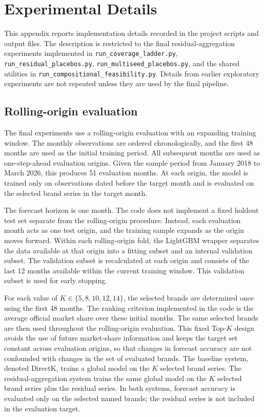 \appendix

\section{Experimental Details}
\label{app:experimental-details}

This appendix reports implementation details recorded in the project scripts and output files. The description is restricted to the final residual-aggregation experiments implemented in \texttt{run\_coverage\_ladder.py}, \texttt{run\_residual\_placebos.py}, \texttt{run\_multiseed\_placebos.py}, and the shared utilities in \texttt{run\_compositional\_feasibility.py}. Details from earlier exploratory experiments are not repeated unless they are used by the final pipeline.

\subsection{Rolling-origin evaluation}
\label{app:rolling-origin}

The final experiments use a rolling-origin evaluation with an expanding training window. The monthly observations are ordered chronologically, and the first 48 months are used as the initial training period. All subsequent months are used as one-step-ahead evaluation origins. Given the sample period from January 2018 to March 2026, this produces 51 evaluation months. At each origin, the model is trained only on observations dated before the target month and is evaluated on the selected brand series in the target month.

The forecast horizon is one month. The code does not implement a fixed holdout test set separate from the rolling-origin procedure. Instead, each evaluation month acts as one test origin, and the training sample expands as the origin moves forward. Within each rolling-origin fold, the LightGBM wrapper separates the data available at that origin into a fitting subset and an internal validation subset. The validation subset is recalculated at each origin and consists of the last 12 months available within the current training window. This validation subset is used for early stopping.

For each value of \(K \in \{5,8,10,12,14\}\), the selected brands are determined once using the first 48 months. The ranking criterion implemented in the code is the average official market share over these initial months. The same selected brands are then used throughout the rolling-origin evaluation. This fixed Top-\(K\) design avoids the use of future market-share information and keeps the target set constant across evaluation origins, so that changes in forecast accuracy are not confounded with changes in the set of evaluated brands. The baseline system, denoted DirectK, trains a global model on the \(K\) selected brand series. The residual-aggregation system trains the same global model on the \(K\) selected brand series plus the residual series. In both systems, forecast accuracy is evaluated only on the selected named brands; the residual series is not included in the evaluation target.

